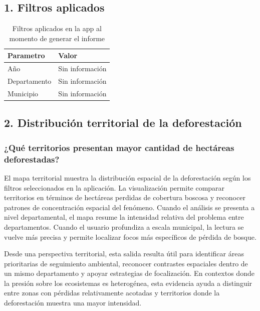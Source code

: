 \documentclass[
]{article}
\begin{document}
\subsection{1. Filtros aplicados}\label{filtros-aplicados}

\begin{table}

\caption{\label{tab:unnamed-chunk-1}Filtros aplicados en la app al momento de generar el informe}
\centering
\begin{tabular}[t]{p{}p{}}
\toprule
Parametro & Valor\\
\midrule
Año & Sin información\\
Departamento & Sin información\\
Municipio & Sin información\\
\bottomrule
\end{tabular}
\end{table}

\subsection{2. Distribución territorial de la
deforestación}\label{distribuciuxf3n-territorial-de-la-deforestaciuxf3n}

\subsubsection{¿Qué territorios presentan mayor cantidad de hectáreas
deforestadas?}\label{quuxe9-territorios-presentan-mayor-cantidad-de-hectuxe1reas-deforestadas}

El mapa territorial muestra la distribución espacial de la deforestación
según los filtros seleccionados en la aplicación. La visualización
permite comparar territorios en términos de hectáreas perdidas de
cobertura boscosa y reconocer patrones de concentración espacial del
fenómeno. Cuando el análisis se presenta a nivel departamental, el mapa
resume la intensidad relativa del problema entre departamentos. Cuando
el usuario profundiza a escala municipal, la lectura se vuelve más
precisa y permite localizar focos más específicos de pérdida de bosque.

Desde una perspectiva territorial, esta salida resulta útil para
identificar áreas prioritarias de seguimiento ambiental, reconocer
contrastes espaciales dentro de un mismo departamento y apoyar
estrategias de focalización. En contextos donde la presión sobre los
ecosistemas es heterogénea, esta evidencia ayuda a distinguir entre
zonas con pérdidas relativamente acotadas y territorios donde la
deforestación muestra una mayor intensidad.
\end{document}
